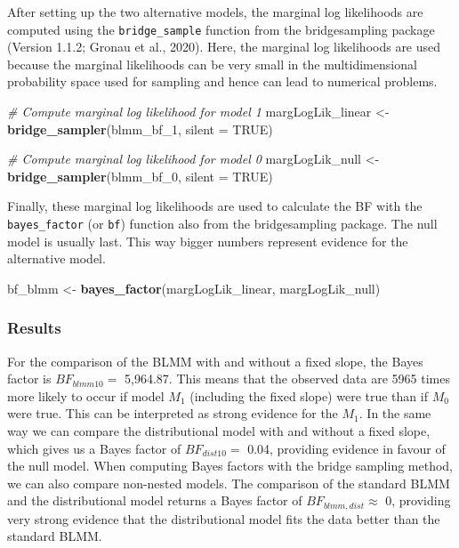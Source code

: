 \documentclass[
  doc,12pt,floatsintext]{apa7}
\newenvironment{Shaded}{\begin{snugshade}}{\end{snugshade}}
\newcommand{\AttributeTok}[1]{\textcolor[rgb]{0.13,0.29,0.53}{#1}}
\newcommand{\CommentTok}[1]{\textcolor[rgb]{0.56,0.35,0.01}{\textit{#1}}}
\newcommand{\ConstantTok}[1]{\textcolor[rgb]{0.56,0.35,0.01}{#1}}
\newcommand{\FunctionTok}[1]{\textcolor[rgb]{0.13,0.29,0.53}{\textbf{#1}}}
\newcommand{\NormalTok}[1]{#1}
\newcommand{\OtherTok}[1]{\textcolor[rgb]{0.56,0.35,0.01}{#1}}
\begin{document}
After setting up the two alternative models, the marginal log likelihoods are computed using the \texttt{bridge\_sample} function from the bridgesampling package (Version 1.1.2; Gronau et al., 2020). Here, the marginal log likelihoods are used because the marginal likelihoods can be very small in the multidimensional probability space used for sampling and hence can lead to numerical problems.

\begin{Shaded}
\begin{Highlighting}[]
\CommentTok{\# Compute marginal log likelihood for model 1}
\NormalTok{margLogLik\_linear }\OtherTok{\textless{}{-}} \FunctionTok{bridge\_sampler}\NormalTok{(blmm\_bf\_1, }\AttributeTok{silent =} \ConstantTok{TRUE}\NormalTok{)}

\CommentTok{\# Compute marginal log likelihood for model 0}
\NormalTok{margLogLik\_null }\OtherTok{\textless{}{-}} \FunctionTok{bridge\_sampler}\NormalTok{(blmm\_bf\_0, }\AttributeTok{silent =} \ConstantTok{TRUE}\NormalTok{)}
\end{Highlighting}
\end{Shaded}

Finally, these marginal log likelihoods are used to calculate the BF with the \texttt{bayes\_factor} (or \texttt{bf}) function also from the bridgesampling package. The null model is usually last. This way bigger numbers represent evidence for the alternative model.

\begin{Shaded}
\begin{Highlighting}[]
\NormalTok{bf\_blmm }\OtherTok{\textless{}{-}} \FunctionTok{bayes\_factor}\NormalTok{(margLogLik\_linear, margLogLik\_null)}
\end{Highlighting}
\end{Shaded}

\subsubsection{Results}\label{results-3}

For the comparison of the BLMM with and without a fixed slope, the Bayes factor is \(BF_{blmm10} =\) 5,964.87. This means that the observed data are 5965 times more likely to occur if model \(M_1\) (including the fixed slope) were true than if \(M_0\) were true. This can be interpreted as strong evidence for the \(M_1\). In the same way we can compare the distributional model with and without a fixed slope, which gives us a Bayes factor of \(BF_{dist10} =\) 0.04, providing evidence in favour of the null model. When computing Bayes factors with the bridge sampling method, we can also compare non-nested models. The comparison of the standard BLMM and the distributional model returns a Bayes factor of \(BF_{blmm,dist} \approx\) 0, providing very strong evidence that the distributional model fits the data better than the standard BLMM.
\end{document}
